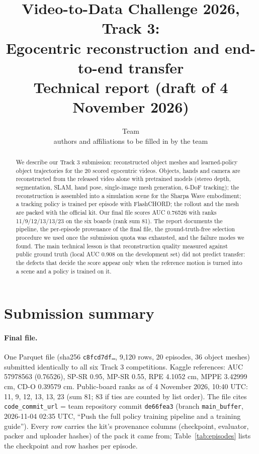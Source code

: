 \documentclass[10pt,a4paper]{article}
\title{Video-to-Data Challenge 2026, Track 3:\\Egocentric reconstruction and end-to-end transfer\\\large Technical report (draft of 4 November 2026)}
\author{Team \teamname\\\small authors and affiliations to be filled in by the team}
\date{}
\newcommand{\code}[1]{\texttt{#1}}
\begin{document}
\maketitle

\begin{abstract}
We describe our Track 3 submission: reconstructed object meshes and learned-policy object trajectories for the 20 scored egocentric videos. Objects, hands and camera are reconstructed from the released video alone with pretrained models (stereo depth, segmentation, SLAM, hand pose, single-image mesh generation, 6-DoF tracking); the reconstruction is assembled into a simulation scene for the Sharpa Wave embodiment; a tracking policy is trained per episode with FlashCHORD; the rollout and the mesh are packed with the official kit. Our final file scores AUC 0.76526 with ranks 11/9/12/13/13/23 on the six boards (rank sum 81). The report documents the pipeline, the per-episode provenance of the final file, the ground-truth-free selection procedure we used once the submission quota was exhausted, and the failure modes we found. The main technical lesson is that reconstruction quality measured against public ground truth (local AUC 0.908 on the development set) did not predict transfer: the defects that decide the score appear only when the reference motion is turned into a scene and a policy is trained on it.
\end{abstract}

\section{Submission summary}
\label{sec:summary}

\paragraph{Final file.} One Parquet file (sha256 \code{c8fcd7df\ldots}, 9{,}120 rows, 20 episodes, 36 object meshes) submitted identically to all six Track 3 competitions. Kaggle references: AUC 57978563 (0.76526), SP-SR 0.95, MP-SR 0.55, RPE 4.1052 cm, MPPE 3.42999 cm, CD-O 0.39579 cm. Public-board ranks as of 4 November 2026, 10:40 UTC: 11, 9, 12, 13, 13, 23 (sum 81; 83 if ties are counted by list order). The file cites \code{code\_commit\_url} = team repository commit \code{de66fea3} (branch \code{main\_buffer}, 2026-11-04 02:35 UTC, ``Push the full policy training pipeline and a training guide''). Every row carries the kit's provenance columns (checkpoint, evaluator, packer and uploader hashes) of the pack it came from; Table~\ref{tab:episodes} lists the checkpoint and row hashes per episode.
\end{document}
